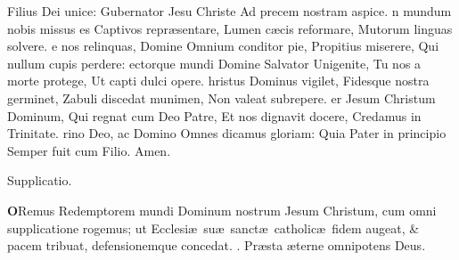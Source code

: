 \documentclass[letter,11pt]{book}
\makeatletter
\DeclareRobustCommand{\Rbar}{\vers@resp{0pt}{R}}
\newcommand{\vers@resp@sym}{\raisebox{0.2ex}{\rotatebox[origin=c]{-20}{$\m@th\rceil$}}}
\newcommand{\vers@resp}[2]{%
  {\ooalign{\hidewidth\kern#1\vers@resp@sym\hidewidth\cr#2\cr}}%
}%
\def\R{\color{Red} \Rbar . \color{black}}
\makeatother
\begin{document}
\begin{multicols*}{2}
\newline \indent Filius Dei unice:
\newline \indent Gubernator Jesu Christe
\newline \indent Ad precem nostram aspice.
n mundum nobis missus es
\newline \indent Captivos repr\ae sentare,
\newline \indent Lumen c\ae cis reformare,
\newline \indent Mutorum linguas solvere.
e nos relinquas, Domine
\newline \indent Omnium conditor pie,
\newline \indent Propitius miserere,
\newline \indent Qui nullum cupis perdere:
ectorque mundi Domine
\newline \indent Salvator Unigenite,
\newline \indent Tu nos a morte protege,
\newline \indent Ut capti dulci opere.
hristus Dominus vigilet,
\newline \indent Fidesque nostra germinet,
\newline \indent Zabuli discedat munimen,
\newline \indent Non valeat subrepere.
er Jesum Christum Dominum,
\newline \indent Qui regnat cum Deo Patre,
\newline \indent Et nos dignavit docere,
\newline \indent Credamus in Trinitate.
rino Deo, ac Domino
\newline \indent Omnes dicamus gloriam:
\newline \indent Quia Pater in principio
\newline \indent Semper fuit cum Filio. Amen.
\vspace{-.5em} \begin{center} \color{Red} Supplicatio. \color{black} \end{center} \vspace{-.5em}
\lettrine[lines=2]{\bfseries \color{Red} O}{}Remus Redemptorem mundi Dominum nostrum Jesum Christum, cum omni supplicatione rogemus; ut Ecclesi\ae \ su\ae \ sanct\ae \ catholic\ae \ fidem augeat, \& pacem tribuat, defensionemque concedat. \R Pr\ae sta \ae terne omnipotens Deus.

\end{multicols*}
\end{document}
